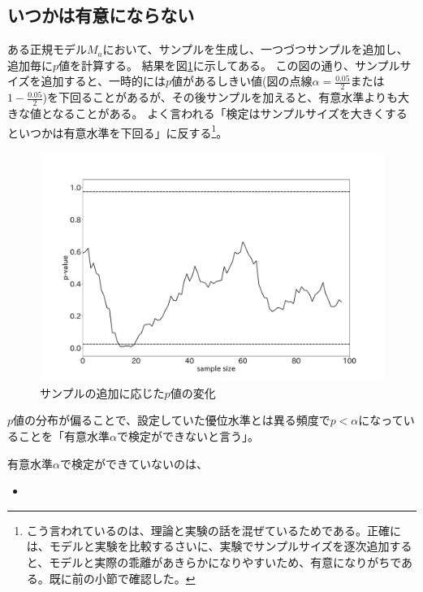 \subsection{いつかは有意にならない}
ある正規モデル$M_a$において、サンプルを生成し、一つづつサンプルを追加し、追加毎に$p$値を計算する。
結果を図\ref{fig:time_series_p_value}に示してある。
この図の通り、サンプルサイズを追加すると、一時的には$p$値があるしきい値(図の点線$\alpha=\frac{0.05}{2}$または$1-\frac{0.05}{2}$)を下回ることがあるが、その後サンプルを加えると、有意水準よりも大きな値となることがある。
よく言われる「検定はサンプルサイズを大きくするといつかは有意水準を下回る」に反する\footnote{こう言われているのは、理論と実験の話を混ぜているためである。正確には、モデルと実験を比較するさいに、実験でサンプルサイズを逐次追加すると、モデルと実際の乖離があきらかになりやすいため、有意になりがちである。既に前の小節で確認した。}。

\begin{figure}
  \begin{center}
    \includegraphics[width=15cm]{./image/04_/recurssive_test.pdf}
    \caption{サンプルの追加に応じた$p$値の変化}
        \label{fig:time_series_p_value}
    \end{center}
\end{figure}




\begin{defi}
  $p$値の分布が偏ることで、設定していた優位水準とは異る頻度で$p<\alpha$になっていることを「有意水準$\alpha$で検定ができないと言う」。
\end{defi}

有意水準$\alpha$で検定ができていないのは、
\begin{itemize}
  \item 
\end{itemize}
\fi


